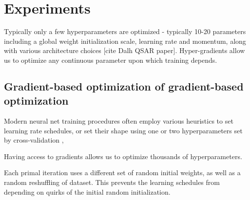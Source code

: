\documentclass{article}
\begin{document}


\section{Experiments}

Typically only a few hyperparameters are optimized - typically 10-20 parameters including a global weight initialization scale, learning rate and momentum, along with various architecture choices [cite Dalh QSAR paper].
Hyper-gradients allow us to optimize any continuous parameter upon which training depends.




\subsection{Gradient-based optimization of gradient-based optimization}

Modern neural net training procedures often employ various heuristics to set learning rate schedules, or set their shape using one or two hyperparameters set by cross-validation \citep{dahl2014multi}, \citep{sutskever2013importance}

Having access to gradients allows us to optimize thousands of hyperparameters.

Each primal iteration uses a different set of random initial weights, as well as a random reshuffling of dataset.
This prevents the learning schedules from depending on quirks of the initial random initialization.
\end{document}
